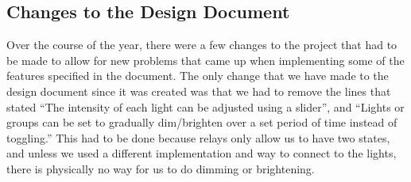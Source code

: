 \subsection{Changes to the Design Document}

Over the course of the year, there were a few changes to the project that had
to be made to allow for new problems that came up when implementing some of the
features specified in the document. The only change that we have made to the
design document since it was created was that we had to remove the lines that
stated ``The intensity of each light can be adjusted using a slider'', and
``Lights or groups can be set to gradually dim/brighten over a set period of
time instead of toggling.'' This had to be done because relays only allow us to
have two states, and unless we used a different implementation and way to
connect to the lights, there is physically no way for us to do dimming or
brightening.
